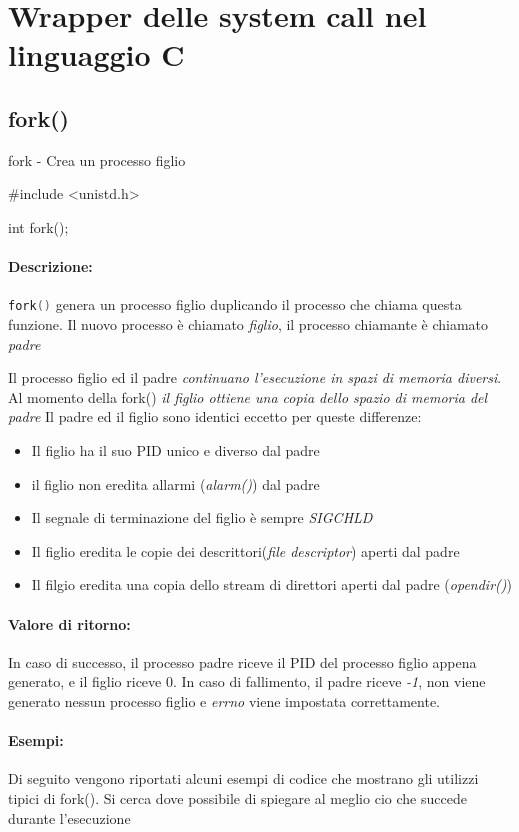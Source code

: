 \documentclass[../main.tex]{subfiles}
\begin{document}
\section{Wrapper delle system call nel linguaggio C}
\subsection{fork()}
fork - Crea un processo figlio
\begin{C}
    #include <unistd.h>

    int fork();
\end{C}
\paragraph{Descrizione:}
\lstinline[language=C]!fork()! genera un processo figlio duplicando il processo che chiama questa funzione.
Il nuovo processo è chiamato \textit{figlio}, il processo chiamante è chiamato \textit{padre}

Il processo figlio ed il padre \textit{continuano l'esecuzione in spazi di memoria diversi}. Al momento della fork() \textit{il figlio ottiene una copia dello spazio di memoria del padre}
Il padre ed il figlio sono identici eccetto per queste differenze:
\begin{itemize}
    \item Il figlio ha il suo PID unico e diverso dal padre
    \item il figlio non eredita allarmi (\textit{alarm()}) dal padre
    \item Il segnale di terminazione del figlio è sempre \textit{SIGCHLD}
    \item Il figlio eredita le copie dei descrittori(\textit{file descriptor}) aperti dal padre
    \item Il filgio eredita una copia dello stream di direttori aperti dal padre (\textit{opendir()})
\end{itemize}
\paragraph{Valore di ritorno:}
In caso di successo, il processo padre riceve il PID del processo figlio appena generato, e il figlio riceve 0. 
In caso di fallimento, il padre riceve \textit{-1}, non viene generato nessun processo figlio e \textit{errno} viene impostata correttamente.
\paragraph{Esempi:}
Di seguito vengono riportati alcuni esempi di codice che mostrano gli utilizzi tipici di fork(). Si cerca dove possibile di spiegare al meglio cio che succede durante l'esecuzione
\end{document}
